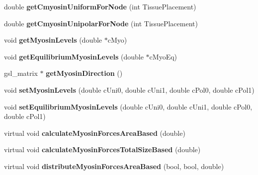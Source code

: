 \begin{DoxyCompactItemize}
\item 
\hypertarget{classShapeBase_a1a1d8053c99109b0c13b06b2cca44dee}{}double {\bfseries get\+Cmyosin\+Uniform\+For\+Node} (int Tissue\+Placement)\label{classShapeBase_a1a1d8053c99109b0c13b06b2cca44dee}

\item 
\hypertarget{classShapeBase_a69ec8a1780b516d47560a25ba17f672a}{}double {\bfseries get\+Cmyosin\+Unipolar\+For\+Node} (int Tissue\+Placement)\label{classShapeBase_a69ec8a1780b516d47560a25ba17f672a}

\item 
\hypertarget{classShapeBase_afa44aa076cefed9d57f61dce7574832a}{}void {\bfseries get\+Myosin\+Levels} (double $\ast$c\+Myo)\label{classShapeBase_afa44aa076cefed9d57f61dce7574832a}

\item 
\hypertarget{classShapeBase_ab31ad5e068aeb94f4e851b64d966547a}{}void {\bfseries get\+Equilibrium\+Myosin\+Levels} (double $\ast$c\+Myo\+Eq)\label{classShapeBase_ab31ad5e068aeb94f4e851b64d966547a}

\item 
\hypertarget{classShapeBase_ad4f62dbbaf09f82cde600361a7926aaa}{}gsl\+\_\+matrix $\ast$ {\bfseries get\+Myosin\+Direction} ()\label{classShapeBase_ad4f62dbbaf09f82cde600361a7926aaa}

\item 
\hypertarget{classShapeBase_afbcfcd90f0942e917fdc1deb1df1be1c}{}void {\bfseries set\+Myosin\+Levels} (double c\+Uni0, double c\+Uni1, double c\+Pol0, double c\+Pol1)\label{classShapeBase_afbcfcd90f0942e917fdc1deb1df1be1c}

\item 
\hypertarget{classShapeBase_adef29b02faa010719b0810d3643c6b62}{}void {\bfseries set\+Equilibrium\+Myosin\+Levels} (double c\+Uni0, double c\+Uni1, double c\+Pol0, double c\+Pol1)\label{classShapeBase_adef29b02faa010719b0810d3643c6b62}

\item 
\hypertarget{classShapeBase_a9dd11948f7d61dfb958f6a06b6d6f188}{}virtual void {\bfseries calculate\+Myosin\+Forces\+Area\+Based} (double)\label{classShapeBase_a9dd11948f7d61dfb958f6a06b6d6f188}

\item 
\hypertarget{classShapeBase_a1c188f23e849768430720014077af1dc}{}virtual void {\bfseries calculate\+Myosin\+Forces\+Total\+Size\+Based} (double)\label{classShapeBase_a1c188f23e849768430720014077af1dc}

\item 
\hypertarget{classShapeBase_a639a01fec2bdd88daa071058ced841d3}{}virtual void {\bfseries distribute\+Myosin\+Forces\+Area\+Based} (bool, bool, double)\label{classShapeBase_a639a01fec2bdd88daa071058ced841d3}


\end{DoxyCompactItemize}
